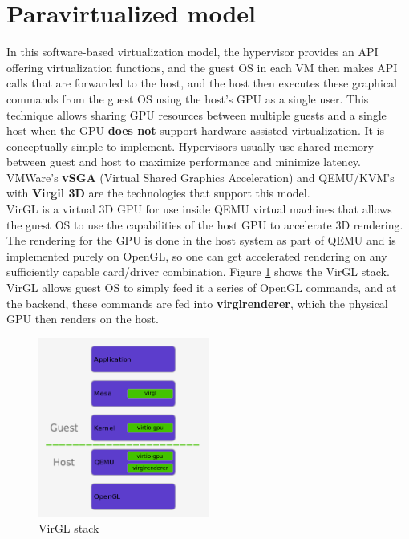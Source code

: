 \documentclass[a4paper,12pt, final]{report}
\begin{document}
\section{Paravirtualized model}
In this software-based virtualization model, the hypervisor provides an API offering virtualization functions, and the guest OS in each VM then makes API calls that are forwarded to the host, and the host then executes these graphical commands from the guest OS using the host's GPU as a single user. This technique allows sharing GPU resources between multiple guests and a single host when the GPU \textbf{does not} support hardware-assisted virtualization. It is conceptually simple to implement. Hypervisors usually use shared memory between guest and host to maximize performance and minimize latency. VMWare's \textbf{vSGA} (Virtual Shared Graphics Acceleration) and QEMU/KVM's with \textbf{Virgil 3D} are the technologies that support this model.\\

\noindent VirGL is a virtual 3D GPU for use inside QEMU virtual machines that allows the guest OS to use the capabilities of the host GPU to accelerate 3D rendering. The rendering for the GPU is done in the host system as part of QEMU and is implemented purely on OpenGL, so one can get accelerated rendering on any sufficiently capable card/driver combination. Figure \ref{fig:virgl_stack} shows the VirGL stack. VirGL allows guest OS to simply feed it a series of OpenGL commands, and at the backend, these commands are fed into \textbf{virglrenderer}, which the physical GPU then renders on the host.\\

\begin{figure}[H]
    \centering
    \includegraphics[width=0.5\textwidth]{images/virgl_stack.png}
    \caption{VirGL stack \cite{virgl_stack}}
    \label{fig:virgl_stack}
\end{figure}
\end{document}
